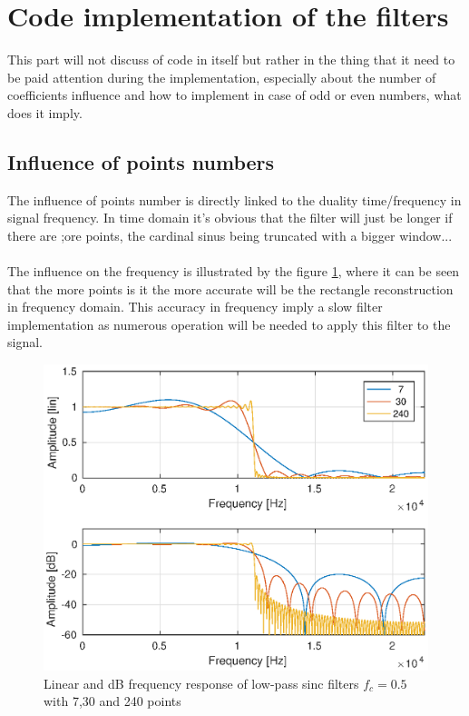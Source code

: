 \documentclass[twoside,twocolumn]{article}
\begin{document}
\section{Code implementation of the filters}
\label{sec:code}
This part will not discuss of code in itself but rather in the thing that it need to be paid attention during the implementation, especially about the number of coefficients influence and how to implement in case of odd or even numbers, what does it imply.

\subsection{Influence of points numbers}
\label{influ}
The influence of points number is directly linked to the duality time/frequency in signal frequency. In time domain it's obvious that the filter will just be longer if there are ;ore points, the cardinal sinus being truncated with a bigger window...\\ \\
The influence on the frequency is illustrated by the figure \ref{influence}, where it can be seen that the more points is it the more accurate will be the rectangle reconstruction in frequency domain. This accuracy in frequency imply a slow filter implementation as numerous operation will be needed to apply this filter to the signal.

\begin{figure}[h!]
	\centering
	\includegraphics[scale=0.5]{./images/pt_influence.eps}
	\caption{Linear and dB frequency response of low-pass sinc filters $f_c=0.5$ with 7,30 and 240 points }
	\label{influence}
\end{figure} 
\end{document}
